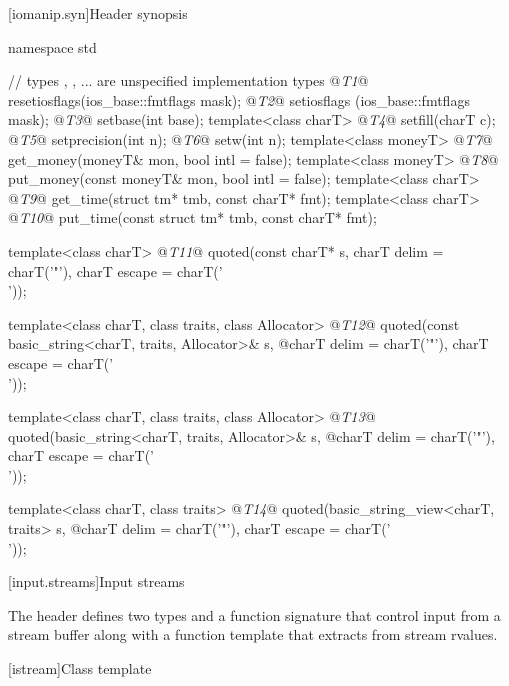 %
%
%
%

[iomanip.syn]{Header  synopsis}
%

\begin{codeblock}
namespace std {
  // types , , ... are unspecified implementation types
  @\textit{T1}@ resetiosflags(ios_base::fmtflags mask);
  @\textit{T2}@ setiosflags  (ios_base::fmtflags mask);
  @\textit{T3}@ setbase(int base);
  template<class charT> @\textit{T4}@ setfill(charT c);
  @\textit{T5}@ setprecision(int n);
  @\textit{T6}@ setw(int n);
  template<class moneyT> @\textit{T7}@ get_money(moneyT& mon, bool intl = false);
  template<class moneyT> @\textit{T8}@ put_money(const moneyT& mon, bool intl = false);
  template<class charT> @\textit{T9}@ get_time(struct tm* tmb, const charT* fmt);
  template<class charT> @\textit{T10}@ put_time(const struct tm* tmb, const charT* fmt);

  template<class charT>
    @\textit{T11}@ quoted(const charT* s, charT delim = charT('"'), charT escape = charT('\\'));

  template<class charT, class traits, class Allocator>
    @\textit{T12}@ quoted(const basic_string<charT, traits, Allocator>& s,
    @\itcorr@           charT delim = charT('"'), charT escape = charT('\\'));

  template<class charT, class traits, class Allocator>
    @\textit{T13}@ quoted(basic_string<charT, traits, Allocator>& s,
    @\itcorr@           charT delim = charT('"'), charT escape = charT('\\'));

  template<class charT, class traits>
    @\textit{T14}@ quoted(basic_string_view<charT, traits> s,
    @\itcorr@           charT delim = charT('"'), charT escape = charT('\\'));
}
\end{codeblock}

[input.streams]{Input streams}

\pnum
The header
defines two types
and a function signature that control input from a stream buffer along with a function template that extracts from stream rvalues.

[istream]{Class template }

